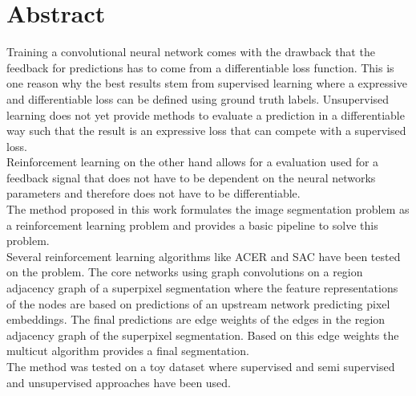 \section*{Abstract}
Training a convolutional neural network comes with the drawback that the feedback for predictions has to come from a differentiable loss function. This is one reason why the best results stem from supervised learning where a expressive and differentiable loss can be defined using ground truth labels. Unsupervised learning does not yet provide methods to evaluate a prediction in a differentiable way such that the result is an expressive loss that can compete with a supervised loss.\\
Reinforcement learning on the other hand allows for a evaluation used for a feedback signal that does not have to be dependent on the neural networks parameters and therefore does not have to be differentiable.\\
The method proposed in this work formulates the image segmentation problem as a reinforcement learning problem and provides a basic pipeline to solve this problem.\\
Several reinforcement learning algorithms like ACER and SAC have been tested on the problem. The core networks using graph convolutions on a region adjacency graph of a superpixel segmentation where the feature representations of the nodes are based on predictions of an upstream network predicting pixel embeddings. The final predictions are edge weights of the edges in the region adjacency graph of the superpixel segmentation. Based on this edge weights the multicut algorithm provides a final segmentation.\\
The method was tested on a toy dataset where supervised and semi supervised and unsupervised approaches have been used.